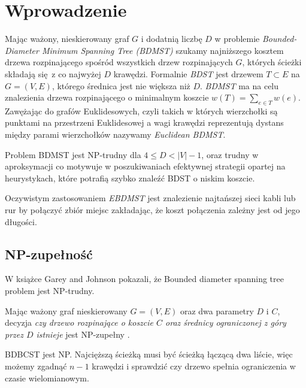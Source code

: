 \section{Wprowadzenie}
Mając ważony, nieskierowany graf $G$ i dodatnią liczbę $D$ w problemie \textit{Bounded-Diameter Minimum Spanning Tree (BDMST)} szukamy najniższego kosztem drzewa rozpinającego spośród wszystkich drzew rozpinających $G$, których ścieżki składają się z co najwyżej $D$ krawędzi. Formalnie \textit{BDST} jest drzewem $T \subset E$ na $G = (V, E)$, którego średnica jest nie większa niż $D$. \textit{BDMST} ma na celu znalezienia drzewa rozpinającego o minimalnym koszcie $w(T) = \sum_{e\in T} w(e)$. Zawężając do grafów Euklidesowych, czyli takich w których wierzchołki są punktami na przestrzeni Euklidesowej a wagi krawędzi reprezentują dystans między parami wierzchołków nazywamy \textit{Euclidean BDMST}.

Problem BDMST jest NP-trudny dla $4 \leq D < |V| - 1$, oraz trudny w aproksymacji co motywuje w poszukiwaniach efektywnej strategii opartej na heurystykach, które potrafią szybko znaleźć BDST o niskim koszcie.

Oczywistym zastosowaniem \textit{EBDMST} jest znalezienie najtańszej sieci kabli lub rur by połączyć zbiór miejsc zakładając, że koszt połączenia zależny jest od jego długości.


\subsection{NP-zupełność}

W książce \cite[p.~206]{10.5555/574848} Garey and Johnson pokazali, że Bounded diameter spanning tree problem jest NP-trudny.

Mając ważony graf nieskierowany $G = (V, E)$ oraz dwa parametry $D$ i $C$, decyzja \textit{czy drzewo rozpinające o koszcie $C$ oraz średnicy ograniczonej z góry przez $D$ istnieje} jest NP-zupełny \cite{DBLP:conf/compgeom/HoL89}.

BDBCST jest NP. Najcięższą ścieżką musi być ścieżką łączącą dwa liście, więc możemy zgadnąć $n-1$ krawędzi i sprawdzić czy drzewo spełnia ograniczenia w czasie wielomianowym.


